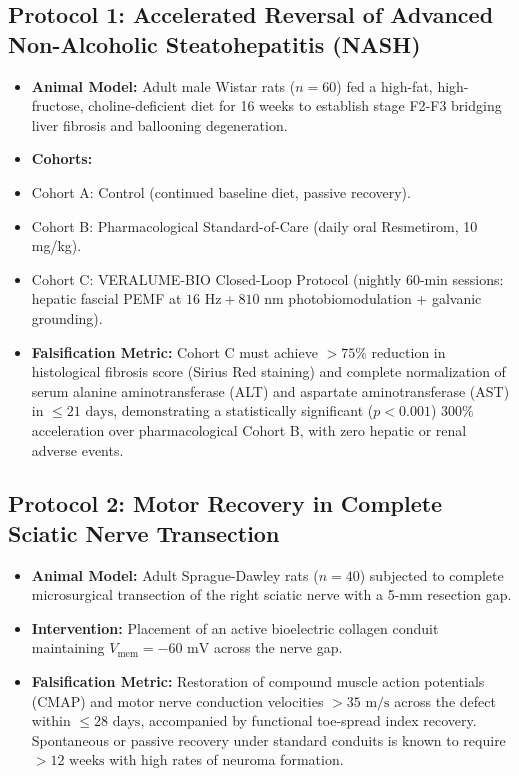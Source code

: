 \documentclass[10pt,twocolumn]{article}
\begin{document}
\subsection{Protocol 1: Accelerated Reversal of Advanced Non-Alcoholic Steatohepatitis (NASH)}
\begin{itemize}
  \item \textbf{Animal Model:} Adult male Wistar rats ($n=60$) fed a high-fat, high-fructose, choline-deficient diet for 16 weeks to establish stage F2-F3 bridging liver fibrosis and ballooning degeneration.
  \item \textbf{Cohorts:}
  \item Cohort A: Control (continued baseline diet, passive recovery).
  \item Cohort B: Pharmacological Standard-of-Care (daily oral Resmetirom, 10 mg/kg).
  \item Cohort C: VERALUME-BIO Closed-Loop Protocol (nightly 60-min sessions: hepatic fascial PEMF at $16\text{ Hz} + 810\text{ nm}$ photobiomodulation + galvanic grounding).
  \item \textbf{Falsification Metric:} Cohort C must achieve $> 75\%$ reduction in histological fibrosis score (Sirius Red staining) and complete normalization of serum alanine aminotransferase (ALT) and aspartate aminotransferase (AST) in \textbf{$\le 21\text{ days}$}, demonstrating a statistically significant ($p < 0.001$) $300\%$ acceleration over pharmacological Cohort B, with zero hepatic or renal adverse events.
\end{itemize}


\subsection{Protocol 2: Motor Recovery in Complete Sciatic Nerve Transection}
\begin{itemize}
  \item \textbf{Animal Model:} Adult Sprague-Dawley rats ($n=40$) subjected to complete microsurgical transection of the right sciatic nerve with a 5-mm resection gap.
  \item \textbf{Intervention:} Placement of an active bioelectric collagen conduit maintaining $V_{\text{mem}} = -60\text{ mV}$ across the nerve gap.
  \item \textbf{Falsification Metric:} Restoration of compound muscle action potentials (CMAP) and motor nerve conduction velocities $> 35\text{ m/s}$ across the defect within \textbf{$\le 28\text{ days}$}, accompanied by functional toe-spread index recovery. Spontaneous or passive recovery under standard conduits is known to require $> 12\text{ weeks}$ with high rates of neuroma formation.
\end{itemize}
\end{document}
